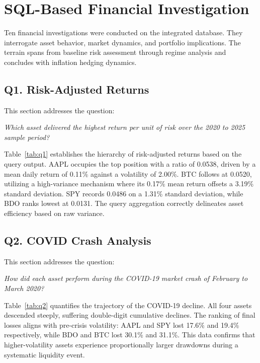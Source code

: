 \section{SQL-Based Financial Investigation}

Ten financial investigations were conducted on the integrated database. They interrogate asset behavior, market dynamics, and portfolio implications. The terrain spans from baseline risk assessment through regime analysis and concludes with inflation hedging dynamics. 

\subsection{Q1. Risk-Adjusted Returns}

This section addresses the question:

\noindent\textit{Which asset delivered the highest return per unit of risk over the 2020 to 2025 sample period?}



Table~\ref{tab:q1} establishes the hierarchy of risk-adjusted returns based on the query output. AAPL occupies the top position with a ratio of 0.0538, driven by a mean daily return of 0.11\% against a volatility of 2.00\%. BTC follows at 0.0520, utilizing a high-variance mechanism where its 0.17\% mean return offsets a 3.19\% standard deviation. SPY records 0.0486 on a 1.31\% standard deviation, while BDO ranks lowest at 0.0131. The query aggregation correctly delineates asset efficiency based on raw variance.

\subsection{Q2. COVID Crash Analysis}

This section addresses the question:

\noindent\textit{How did each asset perform during the COVID-19 market crash of February to March 2020?}



Table~\ref{tab:q2} quantifies the trajectory of the COVID-19 decline. All four assets descended steeply, suffering double-digit cumulative declines. The ranking of final losses aligns with pre-crisis volatility: AAPL and SPY lost 17.6\% and 19.4\% respectively, while BDO and BTC lost 30.1\% and 31.1\%. This data confirms that higher-volatility assets experience proportionally larger drawdowns during a systematic liquidity event.


